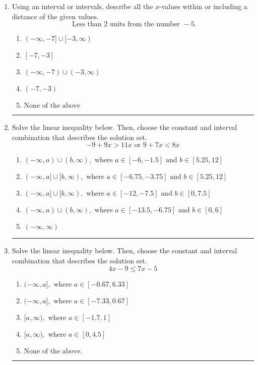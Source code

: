 \documentclass[14pt]{extbook}
\newcommand{\litem}[1]{\item#1\hspace*{-1cm}\rule{\textwidth}{0.4pt}}
\begin{document}
\begin{enumerate}
{\begin{enumerate}[label=\Alph*.]
\end{enumerate} }
\litem{
Using an interval or intervals, describe all the $x$-values within or including a distance of the given values.\[ \text{ Less than } 2 \text{ units from the number } -5. \]\begin{enumerate}[label=\Alph*.]
\item \( (-\infty, -7] \cup [-3, \infty) \)
\item \( [-7, -3] \)
\item \( (-\infty, -7) \cup (-3, \infty) \)
\item \( (-7, -3) \)
\item \( \text{None of the above} \)

\end{enumerate} }
\litem{
Solve the linear inequality below. Then, choose the constant and interval combination that describes the solution set.\[ -9 + 9 x > 11 x \text{ or } 9 + 7 x < 8 x \]\begin{enumerate}[label=\Alph*.]
\item \( (-\infty, a) \cup (b, \infty), \text{ where } a \in [-6, -1.5] \text{ and } b \in [5.25, 12] \)
\item \( (-\infty, a] \cup [b, \infty), \text{ where } a \in [-6.75, -3.75] \text{ and } b \in [5.25, 12] \)
\item \( (-\infty, a] \cup [b, \infty), \text{ where } a \in [-12, -7.5] \text{ and } b \in [0, 7.5] \)
\item \( (-\infty, a) \cup (b, \infty), \text{ where } a \in [-13.5, -6.75] \text{ and } b \in [0, 6] \)
\item \( (-\infty, \infty) \)

\end{enumerate} }
\litem{
Solve the linear inequality below. Then, choose the constant and interval combination that describes the solution set.\[ 4x -9 \leq 7x -5 \]\begin{enumerate}[label=\Alph*.]
\item \( (-\infty, a], \text{ where } a \in [-0.67, 6.33] \)
\item \( (-\infty, a], \text{ where } a \in [-7.33, 0.67] \)
\item \( [a, \infty), \text{ where } a \in [-1.7, 1] \)
\item \( [a, \infty), \text{ where } a \in [0, 4.5] \)
\item \( \text{None of the above}. \)

\end{enumerate} }
\end{enumerate}
\end{document}
